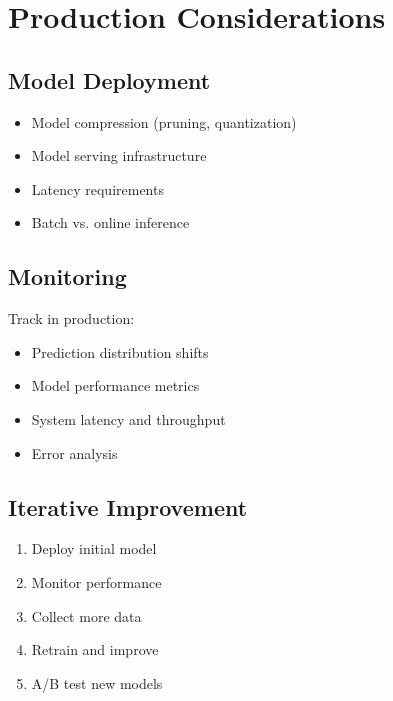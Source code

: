 
\section{Production Considerations}
\label{sec:production}

\subsection{Model Deployment}

\begin{itemize}
    \item Model compression (pruning, quantization)
    \item Model serving infrastructure
    \item Latency requirements
    \item Batch vs. online inference
\end{itemize}

\subsection{Monitoring}

Track in production:
\begin{itemize}
    \item Prediction distribution shifts
    \item Model performance metrics
    \item System latency and throughput
    \item Error analysis
\end{itemize}

\subsection{Iterative Improvement}

\begin{enumerate}
    \item Deploy initial model
    \item Monitor performance
    \item Collect more data
    \item Retrain and improve
    \item A/B test new models
\end{enumerate}
